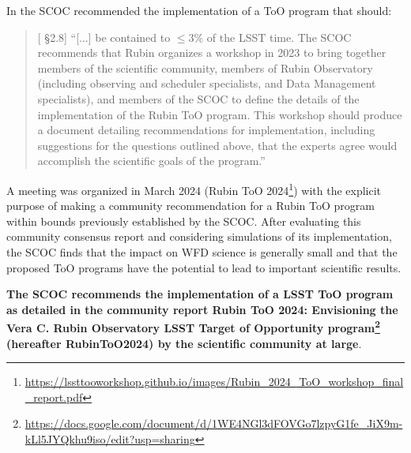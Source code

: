 In  the SCOC recommended the implementation of a ToO program that should:

\begin{quote}
    {[ \S2.8] ``[...] be contained to $\leq$3\% of the LSST time. The SCOC recommends that Rubin organizes a workshop in 2023 to bring together members of the scientific community, members of Rubin Observatory (including observing and scheduler specialists, and Data Management specialists), and members of the SCOC to define the details of the implementation of the Rubin ToO program. This workshop should produce a document detailing recommendations for implementation, including suggestions for the questions outlined above, that the experts agree would accomplish the scientific goals of the program.''}
\end{quote}

A meeting was organized in March 2024 (Rubin ToO 2024\footnote{\url{https://lssttooworkshop.github.io/images/Rubin_2024_ToO_workshop_final_report.pdf}}) with the explicit purpose of making a community recommendation for a Rubin ToO program within bounds previously established by the SCOC. After evaluating this community consensus report and considering simulations of its implementation, the SCOC finds that the impact on WFD science is generally small and that the proposed ToO programs have the potential to lead to important scientific results. 

 {\bf The SCOC recommends the implementation of a LSST ToO program as detailed in the community report Rubin ToO 2024: 
Envisioning the Vera C. Rubin Observatory LSST Target of Opportunity program\footnote{\url{https://docs.google.com/document/d/1WE4NGl3dFOVGo7lzpyG1fe_JiX9m-kLl5JYQkhu9iso/edit?usp=sharing}} (hereafter RubinToO2024) by the scientific community at large}. 


